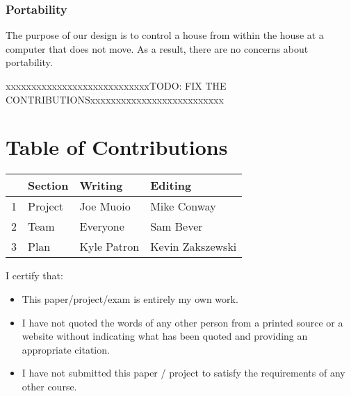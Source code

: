 \documentclass{article}
\begin{document}
\subsubsection{Portability}
The purpose of our design is to control a house from within the house at a computer that does not move. As a result, there are no concerns about portability.



\newpage
{\color{red}xxxxxxxxxxxxxxxxxxxxxxxxxxxxTODO: FIX THE CONTRIBUTIONSxxxxxxxxxxxxxxxxxxxxxxxxxx}
\section*{\centering Table of Contributions}
\begin{tabular}{| l | l | l | l |}
    \hline
     & Section & Writing & Editing \\
    \hline \hline
    1 & Project & Joe Muoio  & Mike Conway \\ \hline
    2 & Team & Everyone & Sam Bever \\ \hline
    3 & Plan & Kyle Patron & Kevin Zakszewski \\ \hline
\end{tabular}
\newpage
\noindent I certify that:
\begin{itemize}
\item This paper/project/exam is entirely my own work.
\item I have not quoted the words of any other person from a printed source or a website without indicating what has been quoted and providing an appropriate citation.
\item I have not submitted this paper / project to satisfy the requirements of any other course.
\end{itemize}

\vspace{1cm}
\noindent{}


\vspace{0.5cm}
\noindent{}

\vspace{0.5cm}
\noindent{}
\end{document}
